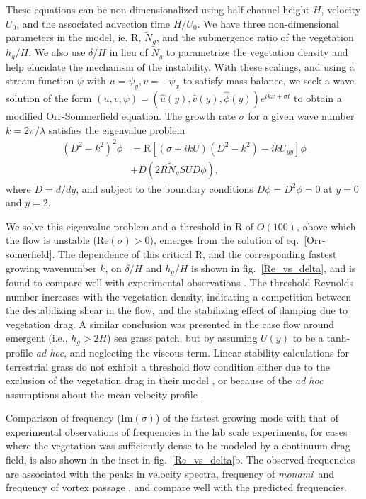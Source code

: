 \documentclass[aps,prl,twocolumn,superscriptaddress,10pt]{revtex4-1}  %
\newcommand{\hg}{h_g}
\newcommand{\Rey}{\text{R}}
\newcommand{\Ndg}{\tilde{N}_g}
\newcommand{\monami}{\textit{monami}}
\begin{document}
These equations can be non-dimensionalized using half channel height $H$, velocity $U_0$, and the associated advection time $H/U_0$. 
We have three non-dimensional parameters in the model, ie. $\Rey$, $\Ndg$, and the submergence ratio of the vegetation $h_g/H$. 
We also use $\delta/H$ in lieu of $\Ndg$ to parametrize the vegetation density and help elucidate the mechanism of the instability. 
With these scalings, and using a stream function $\psi$ with $u = \psi_{y}, v= -\psi_x$ to satisfy mass balance, we seek a wave solution of 
the form $\left(u,v,\psi \right)= \left(\hat u(y), \hat v(y), \hat\phi(y) \right)e^{ikx+\sigma t}$ to  obtain a modified Orr-Sommerfield equation. 
The growth rate $\sigma$ for a given wave number $k=2\pi /\lambda$ satisfies the eigenvalue problem
\begin{equation}
\begin{split}
\left(D^2 -k^{2} \right)^2\phi &= \Rey \left[ \left({\sigma}+ikU\right) \left(D^2-k^2\right) -ikU_{yy}\right]\phi \\
&+D\left(2R \Ndg S U D \phi\right),
\label{Orr-somerfield}
\end{split}
\end{equation}
where $D=d/dy$, and subject to the boundary conditions $D\phi = D^2\phi = 0$ at $y=0$ and $y=2$.

We solve this eigenvalue problem and a threshold in $\Rey$ of $O(100)$, above which the flow is unstable (Re$(\sigma)>0$), emerges from the 
solution of eq.~\eqref{Orr-somerfield}. The dependence of this critical $\Rey$, and the corresponding fastest growing wavenumber $k$, on $\delta/H$ and $\hg/H$ is shown 
in fig.~\ref{Re_vs_delta}, and is found to compare well with experimental observations \cite{Ghisal02}.
The threshold Reynolds number increases with the vegetation density, indicating a competition between the 
destabilizing shear in the flow, and the stabilizing effect of damping due to vegetation drag.
A similar conclusion was presented \cite{White07} in the case flow around emergent (i.e., $\hg>2H$) sea grass patch, but by assuming $U(y)$ to be a tanh-profile \textit{ad hoc}, and neglecting the viscous term.
Linear stability calculations for terrestrial grass do not exhibit a threshold flow condition 
either due to the exclusion of the vegetation drag in their model \cite{Raupach96}, or because of the \textit{ad hoc}
assumptions about the mean velocity profile \cite{Raupach96,Delangre06}. 

Comparison of frequency (Im$(\sigma)$) of the fastest growing mode with that of experimental observations of frequencies in
the lab scale experiments, for cases where the vegetation was sufficiently dense to be modeled by a continuum drag field, is also shown in the inset in fig.~\ref{Re_vs_delta}b. 
The observed frequencies are associated with the peaks in velocity spectra, frequency of \monami ~and frequency of 
vortex passage \cite{Ghisal02}, and compare well with the predicted frequencies. 
\end{document}
